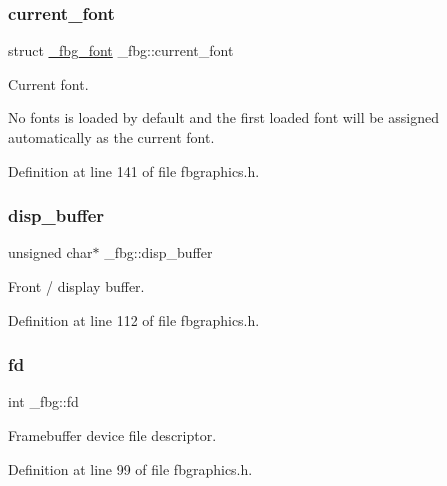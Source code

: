 \mbox{\label{struct__fbg_a72868d703236aaabb7a5031703a6bbd8}} 
\subsubsection{\texorpdfstring{current\+\_\+font}{current\_font}}
{\footnotesize\ttfamily struct \mbox{\hyperlink{fbgraphics_8h_struct__fbg__font}{\+\_\+fbg\+\_\+font}} \+\_\+fbg\+::current\+\_\+font}



Current font. 

No fonts is loaded by default and the first loaded font will be assigned automatically as the current font. 

Definition at line 141 of file fbgraphics.\+h.

\mbox{\label{struct__fbg_aa20614c94c7235bc5bc105b6e71e1be8}} 
\subsubsection{\texorpdfstring{disp\+\_\+buffer}{disp\_buffer}}
{\footnotesize\ttfamily unsigned char$\ast$ \+\_\+fbg\+::disp\+\_\+buffer}



Front / display buffer. 



Definition at line 112 of file fbgraphics.\+h.

\mbox{\label{struct__fbg_acfa58132f44f89e832ae7f73f5583b7e}} 
\subsubsection{\texorpdfstring{fd}{fd}}
{\footnotesize\ttfamily int \+\_\+fbg\+::fd}



Framebuffer device file descriptor. 



Definition at line 99 of file fbgraphics.\+h.

\mbox{\label{struct__fbg_ad3cac82bd9448a4020a4e08621f5269a}} 
